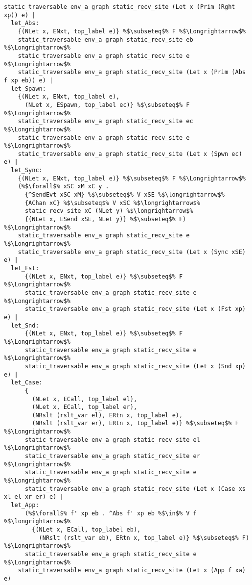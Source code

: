 \begin{lstlisting}[style=codestyle1, escapechar=\%]
      static_traversable env_a graph static_recv_site (Let x (Prim (Rght xp)) e) |
  let_Abs:
    {(NLet x, ENxt, top_label e)} %$\subseteq$% F %$\Longrightarrow$%
    static_traversable env_a graph static_recv_site eb %$\Longrightarrow$%
    static_traversable env_a graph static_recv_site e %$\Longrightarrow$%
    static_traversable env_a graph static_recv_site (Let x (Prim (Abs f xp eb)) e) |
  let_Spawn:
    {(NLet x, ENxt, top_label e),
      (NLet x, ESpawn, top_label ec)} %$\subseteq$% F %$\Longrightarrow$%
    static_traversable env_a graph static_recv_site ec %$\Longrightarrow$%
    static_traversable env_a graph static_recv_site e %$\Longrightarrow$%
    static_traversable env_a graph static_recv_site (Let x (Spwn ec) e) |
  let_Sync:
    {(NLet x, ENxt, top_label e)} %$\subseteq$% F %$\Longrightarrow$%
    (%$\forall$% xSC xM xC y .
      {^SendEvt xSC xM} %$\subseteq$% V xSE %$\longrightarrow$%
      {AChan xC} %$\subseteq$% V xSC %$\longrightarrow$%
      static_recv_site xC (NLet y) %$\longrightarrow$%
      {(NLet x, ESend xSE, NLet y)} %$\subseteq$% F) %$\Longrightarrow$%
    static_traversable env_a graph static_recv_site e %$\Longrightarrow$%
    static_traversable env_a graph static_recv_site (Let x (Sync xSE) e) |
  let_Fst:
      {(NLet x, ENxt, top_label e)} %$\subseteq$% F %$\Longrightarrow$%
      static_traversable env_a graph static_recv_site e %$\Longrightarrow$%
      static_traversable env_a graph static_recv_site (Let x (Fst xp) e) |
  let_Snd:
      {(NLet x, ENxt, top_label e)} %$\subseteq$% F %$\Longrightarrow$%
      static_traversable env_a graph static_recv_site e %$\Longrightarrow$%
      static_traversable env_a graph static_recv_site (Let x (Snd xp) e) |
  let_Case:
      {
        (NLet x, ECall, top_label el),
        (NLet x, ECall, top_label er),
        (NRslt (rslt_var el), ERtn x, top_label e),
        (NRslt (rslt_var er), ERtn x, top_label e)} %$\subseteq$% F %$\Longrightarrow$%
      static_traversable env_a graph static_recv_site el %$\Longrightarrow$%
      static_traversable env_a graph static_recv_site er %$\Longrightarrow$%
      static_traversable env_a graph static_recv_site e %$\Longrightarrow$%
      static_traversable env_a graph static_recv_site (Let x (Case xs xl el xr er) e) |
  let_App:
      (%$\forall$% f' xp eb . ^Abs f' xp eb %$\in$% V f %$\longrightarrow$%
        {(NLet x, ECall, top_label eb),
          (NRslt (rslt_var eb), ERtn x, top_label e)} %$\subseteq$% F) %$\Longrightarrow$%
      static_traversable env_a graph static_recv_site e %$\Longrightarrow$%
    static_traversable env_a graph static_recv_site (Let x (App f xa) e)

  \end{lstlisting}


